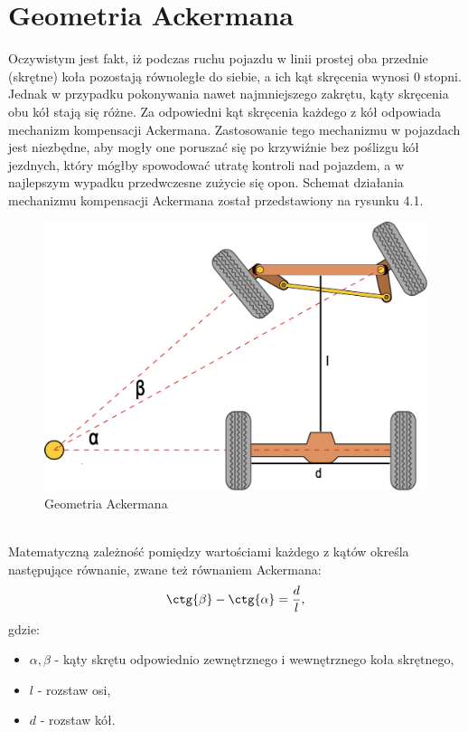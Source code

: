 \documentclass[a4paper,11pt,twoside]{report}
\theoremstyle{definition}
\begin{document}
\section{Geometria Ackermana}

Oczywistym jest fakt, iż podczas ruchu pojazdu w linii prostej oba przednie (skrętne) koła pozostają równoległe do siebie, a ich kąt skręcenia wynosi 0 stopni. Jednak w przypadku pokonywania nawet najmniejszego zakrętu, kąty skręcenia obu kół stają się różne. Za odpowiedni kąt skręcenia każdego z kół odpowiada mechanizm kompensacji Ackermana. Zastosowanie tego mechanizmu w pojazdach jest niezbędne, aby mogły one poruszać się po krzywiźnie bez poślizgu kół jezdnych, który mógłby spowodować utratę kontroli nad pojazdem, a w najlepszym wypadku przedwczesne zużycie się opon. Schemat działania mechanizmu kompensacji Ackermana został przedstawiony na rysunku 4.1.

\begin{figure}[h!]
\centering
\includegraphics[scale=0.2]{ackermanGeometry}
\caption[Geometria Ackermana]{Geometria Ackermana}
\end{figure}

~\\Matematyczną zależność pomiędzy wartościami każdego z kątów określa następujące równanie, zwane też równaniem Ackermana:
$$
\ctg{\beta} - \ctg{\alpha} = \frac{d}{l},
$$
gdzie:
\begin{itemize}
	\item $\alpha, \beta$ - kąty skrętu odpowiednio zewnętrznego i wewnętrznego koła skrętnego,
	\item $l$ - rozstaw osi,
	\item $d$ - rozstaw kół.
\end{itemize}
\newpage
\end{document}
